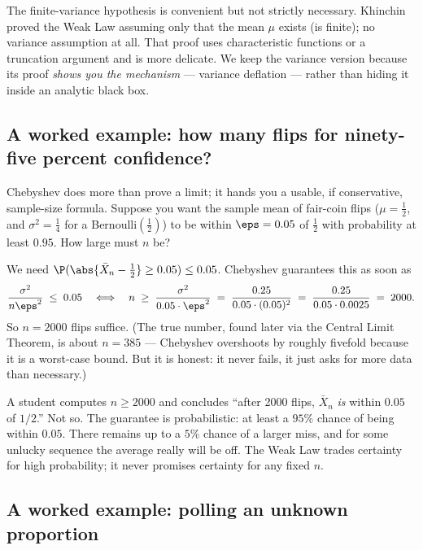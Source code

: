 \begin{remark}
The finite-variance hypothesis is convenient but not strictly necessary. Khinchin proved the Weak Law assuming only that the mean $\mu$ exists (is finite); no variance assumption at all. That proof uses characteristic functions or a truncation argument and is more delicate. We keep the variance version because its proof \emph{shows you the mechanism} --- variance deflation --- rather than hiding it inside an analytic black box.
\end{remark}

\subsection{A worked example: how many flips for ninety-five percent confidence?}

Chebyshev does more than prove a limit; it hands you a usable, if conservative, sample-size formula. Suppose you want the sample mean of fair-coin flips ($\mu=\tfrac12$, and $\sigma^2 = \tfrac14$ for a Bernoulli$(\tfrac12)$) to be within $\eps = 0.05$ of $\tfrac12$ with probability at least $0.95$. How large must $n$ be?

We need $\P(\abs{\bar X_n - \tfrac12} \ge 0.05) \le 0.05$. Chebyshev guarantees this as soon as
\[
  \frac{\sigma^2}{n\eps^2} \;\le\; 0.05
  \quad\Longleftrightarrow\quad
  n \;\ge\; \frac{\sigma^2}{0.05 \cdot \eps^2}
  \;=\; \frac{0.25}{0.05 \cdot (0.05)^2}
  \;=\; \frac{0.25}{0.05 \cdot 0.0025}
  \;=\; 2000.
\]
So $n = 2000$ flips suffice. (The true number, found later via the Central Limit Theorem, is about $n=385$ --- Chebyshev overshoots by roughly fivefold because it is a worst-case bound. But it is honest: it never fails, it just asks for more data than necessary.)

\begin{trapbox}
A student computes $n \ge 2000$ and concludes ``after 2000 flips, $\bar X_n$ \emph{is} within $0.05$ of $1/2$.'' Not so. The guarantee is probabilistic: at least a $95\%$ chance of being within $0.05$. There remains up to a $5\%$ chance of a larger miss, and for some unlucky sequence the average really will be off. The Weak Law trades certainty for high probability; it never promises certainty for any fixed $n$.
\end{trapbox}

\subsection{A worked example: polling an unknown proportion}


